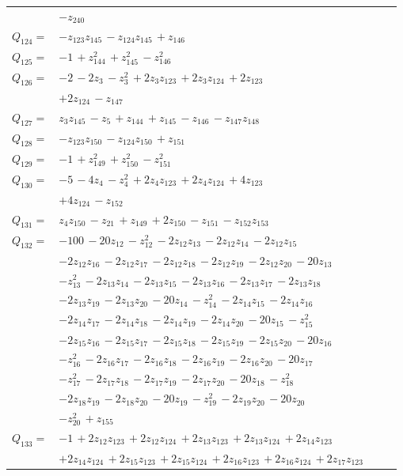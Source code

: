\begin{longtable}{@{}r p{0.88\linewidth}@{}}
 & $-z_{240}$\\[5pt]
$Q_{124}=$ & $-z_{123}z_{145}\,-z_{124}z_{145}\,+z_{146}$\\[5pt]
$Q_{125}=$ & $-1\,+z_{144}^{2}\,+z_{145}^{2}\,-z_{146}^{2}$\\[5pt]
$Q_{126}=$ & $-2\,-2z_{3}\,-z_{3}^{2}\,+2z_{3}z_{123}\,+2z_{3}z_{124}\,+2z_{123}$\\
 & $+2z_{124}\,-z_{147}$\\[5pt]
$Q_{127}=$ & $z_{3}z_{145}\,-z_{5}\,+z_{144}\,+z_{145}\,-z_{146}\,-z_{147}z_{148}$\\[5pt]
$Q_{128}=$ & $-z_{123}z_{150}\,-z_{124}z_{150}\,+z_{151}$\\[5pt]
$Q_{129}=$ & $-1\,+z_{149}^{2}\,+z_{150}^{2}\,-z_{151}^{2}$\\[5pt]
$Q_{130}=$ & $-5\,-4z_{4}\,-z_{4}^{2}\,+2z_{4}z_{123}\,+2z_{4}z_{124}\,+4z_{123}$\\
 & $+4z_{124}\,-z_{152}$\\[5pt]
$Q_{131}=$ & $z_{4}z_{150}\,-z_{21}\,+z_{149}\,+2z_{150}\,-z_{151}\,-z_{152}z_{153}$\\[5pt]
$Q_{132}=$ & $-100\,-20z_{12}\,-z_{12}^{2}\,-2z_{12}z_{13}\,-2z_{12}z_{14}\,-2z_{12}z_{15}$\\
 & $-2z_{12}z_{16}\,-2z_{12}z_{17}\,-2z_{12}z_{18}\,-2z_{12}z_{19}\,-2z_{12}z_{20}\,-20z_{13}$\\
 & $-z_{13}^{2}\,-2z_{13}z_{14}\,-2z_{13}z_{15}\,-2z_{13}z_{16}\,-2z_{13}z_{17}\,-2z_{13}z_{18}$\\
 & $-2z_{13}z_{19}\,-2z_{13}z_{20}\,-20z_{14}\,-z_{14}^{2}\,-2z_{14}z_{15}\,-2z_{14}z_{16}$\\
 & $-2z_{14}z_{17}\,-2z_{14}z_{18}\,-2z_{14}z_{19}\,-2z_{14}z_{20}\,-20z_{15}\,-z_{15}^{2}$\\
 & $-2z_{15}z_{16}\,-2z_{15}z_{17}\,-2z_{15}z_{18}\,-2z_{15}z_{19}\,-2z_{15}z_{20}\,-20z_{16}$\\
 & $-z_{16}^{2}\,-2z_{16}z_{17}\,-2z_{16}z_{18}\,-2z_{16}z_{19}\,-2z_{16}z_{20}\,-20z_{17}$\\
 & $-z_{17}^{2}\,-2z_{17}z_{18}\,-2z_{17}z_{19}\,-2z_{17}z_{20}\,-20z_{18}\,-z_{18}^{2}$\\
 & $-2z_{18}z_{19}\,-2z_{18}z_{20}\,-20z_{19}\,-z_{19}^{2}\,-2z_{19}z_{20}\,-20z_{20}$\\
 & $-z_{20}^{2}\,+z_{155}$\\[5pt]
$Q_{133}=$ & $-1\,+2z_{12}z_{123}\,+2z_{12}z_{124}\,+2z_{13}z_{123}\,+2z_{13}z_{124}\,+2z_{14}z_{123}$\\
 & $+2z_{14}z_{124}\,+2z_{15}z_{123}\,+2z_{15}z_{124}\,+2z_{16}z_{123}\,+2z_{16}z_{124}\,+2z_{17}z_{123}$\\

\end{longtable}
